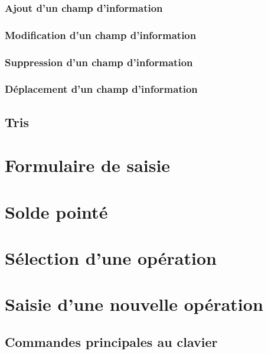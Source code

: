 \subsubsection{Ajout d'un champ d'information\label{transactions-list-fields-add}}


\subsubsection{Modification d'un champ d'information\label{transactions-list-fields-modify}}


\subsubsection{Suppression d'un champ d'information\label{transactions-list-fields-remove}}


\subsubsection{Déplacement d'un champ d'information\label{transactions-list-fields-move}}


\subsection{Tris\label{transactions-list-sorts}}


\section{Formulaire de saisie\label{transactions-form}}


\section{Solde pointé\label{transactions-balance}}


\section{Sélection d'une opération \label{transactions-selection}}


\section{Saisie d'une nouvelle opération\label{transactions-new}}


\subsection{Commandes principales au clavier\label{transactions-new-keyboard}}


